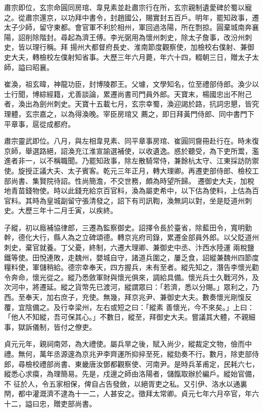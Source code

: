 \begin{pinyinscope}
 肅宗即位，玄宗命圓同房琯、韋見素並赴肅宗行在所，玄宗親制遺愛碑於蜀以寵之。從肅宗還京，以功拜中書令，封趙國公，賜實封五百戶。明年，罷知政事，遷太子少師，留守東都。會官軍不利於相州，軍回過洛陽，所在剽掠。圓棄城南奔襄陽，詔削除階封。尋起為濟王傅。李光弼用為懷州刺史，除太子詹事，改汾州刺史，皆以理行稱。拜
 揚州大都督府長史、淮南節度觀察使，加檢校右僕射、兼御史大夫，轉檢校左僕射知省事。大歷三年六月薨，年六十四，輟朝三日，贈太子太師，謚曰昭襄。



 崔渙，祖玄暐，神龍功臣，封博陵郡王。父璩，文學知名，位至禮部侍郎。渙少以士行聞，博綜經籍，尤善談論，累遷尚書司門員外郎。天寶末，楊國忠出不附己者，渙出為劍州刺史。天寶十五載七月，玄宗幸蜀，渙迎謁於路，抗詞忠懇，皆究理體，玄宗嘉之，以為得渙晚。宰臣房琯又
 薦之，即日拜黃門侍郎、同中書門下平章事，扈從成都府。



 肅宗靈武即位。八月，與左相韋見素、同平章事房琯、崔圓同齎冊赴行在。時未復京師，舉選路絕，詔渙充江淮宣諭選補使，以收遺逸。惑於聽受，為下吏所鬻，濫進者非一，以不稱職聞。乃罷知政事，除左散騎常侍，兼餘杭太守、江東採訪防禦使。旋授正議大夫、太子賓客。乾元三年正月，轉大理卿。再遷吏部侍郎、檢校工部尚書、集賢院待詔。性尚簡澹，不交世務，頗為時望所歸。
 遷御史大夫，加稅地青苗錢物使。時以此錢充給京百官料，渙為屬吏希中，以下估為使料，上估為百官料。其時為皇城副留守張清發之，詔下有司訊鞫，渙無詞以對，坐是貶道州刺史。大歷三年十二月壬寅，以疾終。



 子縱，初以廕補協律郎，三遷為監察御史。詔擇令長於臺省，除藍田令，寬明勤幹，德化大行，縣人為之立碑頌德。轉京兆府司錄，累遷金部員外郎。以父貶道州刺史，棄官就養。丁父憂，終制，六遷大理卿、兼御史中丞、汴西水陸運
 兩稅鹽鐵等使。田悅連敗，走魏州，嬰城自守，諸道兵圍之，屢乏食，詔縱兼魏州四節度糧料使，軍儲稍給。德宗幸奉天，四方握兵，未有至者。縱先知之，潛告李懷光勸令奔命，懷光從之。縱乃悉斂軍財與懷光俱來，調給具備。懷光兵士久戰河外，及次河中，將遷延。縱之貨幣先已渡河，縱謂眾曰：「若濟，悉以分賜。」眾利之，乃西。至奉天，加右庶子，充使。無幾，拜京兆尹、兼御史大夫。數奏懷光剛愎反覆，宜陰備之。及行幸梁州，左右或短之曰：「縱素
 善懷光，今不來矣。」上曰：「他人不知縱，吾可保其心。」不數日，縱至，拜御史大夫。嘗議其大體，不親細事，獄訴儀制，皆付之僚吏。



 貞元元年，親祠南郊，為大禮使。屬兵旱之後，賦入尚少，縱裁定文物，儉而中禮。無何，萬年丞源邃為京兆尹李齊運所抑捽至死，縱劾奏不行。數月，除吏部侍郎，尋檢校禮部尚書、東畿唐汝鄧都觀察使、河南尹。是時兵革甫定，民耗六七，縱悉心求瘼，為理簡易。先是，戍邊之師由洛陽者，儲餼取辦於編戶。縱始官備，不
 征於人，令五家相保，俾自占告發斂，以絕胥吏之私。又引伊、洛水以通裏閈，都中灌溉濟不逮為十一二，人甚安之。徵拜太常卿。貞元七年六月卒官，年六十二，謚曰忠，贈吏部尚書。




\end{pinyinscope}
